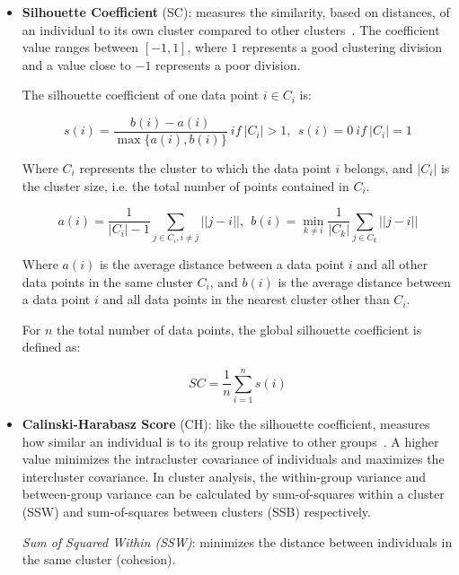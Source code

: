 \begin{itemize}
    \item \textbf{Silhouette Coefficient} (SC): measures the similarity, based on distances, of an individual to its own cluster compared to other clusters~\cite{rousseeuw1987silhouettes}. The coefficient value ranges between $[-1, 1]$, where $1$ represents a good clustering division and a value close to $-1$ represents a poor division.

    The silhouette coefficient of one data point $i \in C_i$ is:

    \begin{equation}
        s(i)=\frac{b(i)-a(i)}{\max\{a(i),b(i)\}} \ if \ |C_i|>1, \ \ s(i)=0 \ if \ |C_i|=1
    \end{equation}
    
    Where $C_i$ represents the cluster to which the data point $i$ belongs, and $|C_i|$ is the cluster size, i.e. the total number of points contained in $C_i$.

    \begin{equation}
        a(i)=\frac{1}{|C_i|-1} \sum_{j\in C_i,i\neq j} ||j-i||, \ \ b(i)=\min_{k\neq i} \frac{1}{|C_k|} \sum_{j\in C_k} ||j-i||
    \end{equation}

    Where $a(i)$ is the average distance between a data point $i$ and all other data points in the same cluster $C_i$, and $b(i)$ is the average distance between a data point $i$ and all data points in the nearest cluster other than $C_i$.

    For $n$ the total number of data points, the global silhouette coefficient is defined as:

    \begin{equation}
        SC=\frac{1}{n}\sum_{i=1}^n s(i)
    \end{equation}
    
    
    \item \textbf{Calinski-Harabasz Score} (CH): like the silhouette coefficient, measures how similar an individual is to its group relative to other groups~\cite{calinski1974dendrite}. A higher value minimizes the intracluster covariance of individuals and maximizes the intercluster covariance. In cluster analysis, the within-group variance and between-group variance can be calculated by sum-of-squares within a cluster (SSW) and sum-of-squares between clusters (SSB) respectively.

\textit{Sum of Squared Within (SSW)}: minimizes the distance between individuals in the same cluster (cohesion).


\end{itemize}
